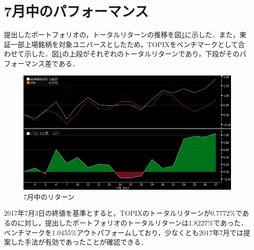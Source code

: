 ﻿\documentclass[11pt]{jreport}
\begin{document}
\section{7月中のパフォーマンス}

提出したポートフォリオの，トータルリターンの推移を図\ref{fig:totalreturn}に示した．また，東証一部上場銘柄を対象ユニバースとしたため，TOPIXをベンチマークとして合わせて示した．図\ref{fig:totalreturn}の上段がそれぞれのトータルリターンであり，下段がそのパフォーマンス差である．

\begin{figure}[htbp]
	\begin{center}
		\includegraphics[width=15cm]{./fig/totalreturn.png}
		\caption{7月中のリターン}
		\label{fig:totalreturn}
	\end{center}
\end{figure}

2017年7月3日の終値を基準とすると，TOPIXのトータルリターンが0.7772\%であるのに対し，提出したポートフォリオのトータルリターンは1.8227\%であった．
ベンチマークを1.0455\%アウトパフォームしており，少なくとも2017年7月では提案した手法が有効であったことが確認できる．
\end{document}
